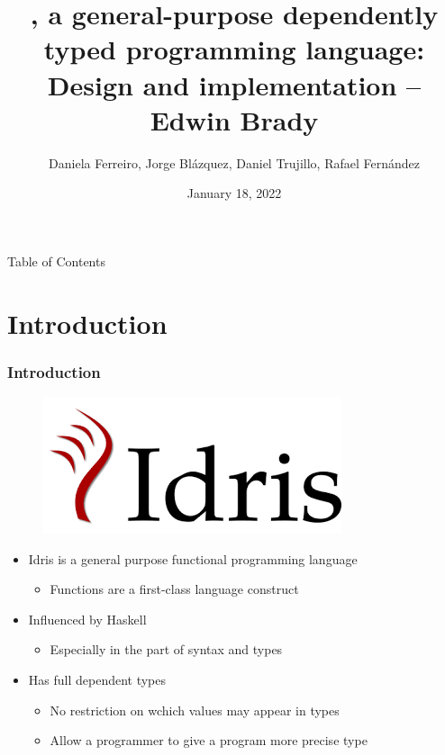 \documentclass{beamer}
\title{\Idris, a general-purpose dependently typed programming language: Design and implementation -- Edwin Brady}
\author{Daniela Ferreiro, Jorge Blázquez, Daniel Trujillo, Rafael Fernández}
\date{January 18, 2022}
\begin{document}
\frame{\titlepage}

\begin{frame}{Table of Contents}
	\tableofcontents
\end{frame}
\newcommand{\intro}{Introduction}
\section{\intro}
\label{sec:intro}

\begin{frame}
	\frametitle{\intro}
	\begin{figure}
		\includegraphics[width=0.3\linewidth]{pics/idris.png}
		\label{fig:boat1}
	\end{figure}
	\begin{itemize}
		\setlength\itemsep{1em} 
		\item Idris is a general purpose functional programming language
		\begin{itemize}
			\item Functions are a first-class language construct
		\end{itemize}  
		\item Influenced by Haskell
		\begin{itemize}
			\item Especially in the part of syntax and types
		\end{itemize}   
		\item Has full dependent types
		\begin{itemize}
			\item No restriction on wchich values may appear in types
			\item Allow a programmer to give a program more precise type
		\end{itemize}   
	\end{itemize}
\end{frame}

\newcommand{\dependentTypes}{Dependent Types - Examples}
\end{document}
